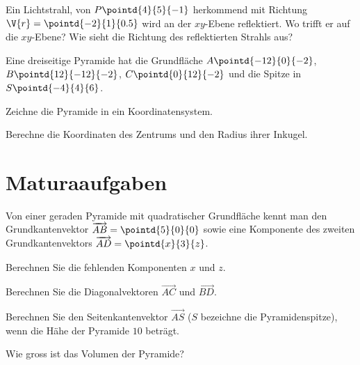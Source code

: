\documentclass[%
11pt,%
twoside,%
titlepage,%
german,%
headsepline%
]{scrartcl}
\theoremstyle{definition}
\theoremstyle{plain}
\begin{document}
\begin{ueb}[Reflexion]
Ein Lichtstrahl, von $P\pointd{4}{5}{-1}$ herkommend mit Richtung $\V{r}=\pointd{-2}{1}{0.5}$ wird an der $xy$-Ebene reflektiert. Wo trifft er auf die $xy$-Ebene? Wie sieht die Richtung des reflektierten Strahls aus?
\end{ueb}

\begin{ueb}[Pyramide]
Eine
dreiseitige Pyramide hat die Grundfläche $A\pointd{-12}{0}{-2}$, $B\pointd{12}{-12}{-2}$, $C\pointd{0}{12}{-2}$ und die Spitze in $S\pointd{-4}{4}{6}$.
\begin{enumeratea}
\item Zeichne die Pyramide in ein Koordinatensystem.
\item Berechne die Koordinaten des Zentrums und den Radius ihrer Inkugel.
\end{enumeratea}
\end{ueb}

\clearpage

\appendix

\section{Maturaaufgaben}
\begin{ueb}
Von einer geraden Pyramide mit quadratischer Grundfläche kennt man den Grundkantenvektor $\overrightarrow{AB}=\pointd{5}{0}{0}$ sowie eine Komponente des zweiten Grundkantenvektors $\overrightarrow{AD}=\pointd{x}{3}{z}$.
\begin{enumeratea}
\item Berechnen Sie die fehlenden Komponenten $x$ und $z$.
\item Berechnen Sie die Diagonalvektoren $\overrightarrow{AC}$ und $\overrightarrow{BD}$.
\item Berechnen Sie den Seitenkantenvektor $\overrightarrow{AS}$ ($S$ bezeichne die Pyramidenspitze), wenn die Hähe der Pyramide $10$ beträgt.
\item Wie gross ist das Volumen der Pyramide?
\end{enumeratea}
\end{ueb}
\end{document}
